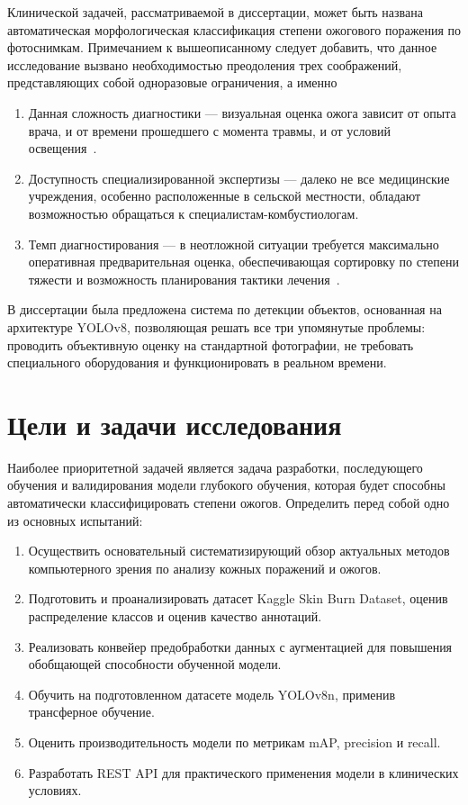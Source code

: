 Клинической задачей, рассматриваемой в диссертации, может быть названа автоматическая морфологическая классификация степени ожогового поражения по фотоснимкам. Примечанием к вышеописанному следует добавить, что данное исследование вызвано необходимостью преодоления трех соображений, представляющих собой одноразовые ограничения, а именно

\begin{enumerate}
\item Данная сложность диагностики --- визуальная оценка ожога зависит от опыта врача, и от времени прошедшего с момента травмы, и от условий освещения~\cite{monstrey2008assessment}.
\item Доступность специализированной экспертизы --- далеко не все медицинские учреждения, особенно расположенные в сельской местности, обладают возможностью обращаться к специалистам-комбустиологам.
\item Темп диагностирования --- в неотложной ситуации требуется максимально оперативная предварительная оценка, обеспечивающая сортировку по степени тяжести и возможность планирования тактики лечения~\cite{peck2012burns}.
\end{enumerate}

В диссертации была предложена система по детекции объектов, основанная на архитектуре YOLOv8, позволяющая решать все три упомянутые проблемы: проводить объективную оценку на стандартной фотографии, не требовать специального оборудования и функционировать в реальном времени. \section{Цели и задачи исследования}

Наиболее приоритетной задачей является задача разработки, последующего обучения и валидирования модели глубокого обучения, которая будет способны автоматически классифицировать степени ожогов. Определить перед собой одно из основных испытаний:

\begin{enumerate}
\item Осуществить основательный систематизирующий обзор актуальных методов компьютерного зрения по анализу кожных поражений и ожогов.
\item Подготовить и проанализировать датасет Kaggle Skin Burn Dataset, оценив распределение классов и оценив качество аннотаций.
\item Реализовать конвейер предобработки данных с аугментацией для повышения обобщающей способности обученной модели.
\item Обучить на подготовленном датасете модель YOLOv8n, применив трансферное обучение.
\item Оценить производительность модели по метрикам mAP, precision и recall.
\item Разработать REST API для практического применения модели в клинических условиях.
\end{enumerate}

